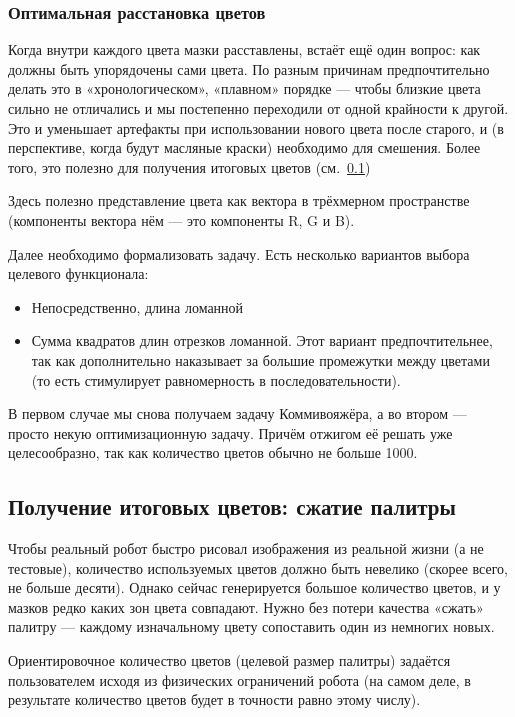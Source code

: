 \subsubsection{Оптимальная расстановка цветов}\label{subsubsec:color-sequence}

Когда внутри каждого цвета мазки расставлены, встаёт ещё один вопрос: как должны быть упорядочены сами цвета.
По разным причинам предпочтительно делать это в «хронологическом», «плавном» порядке — чтобы близкие цвета
сильно не отличались и мы постепенно переходили от одной крайности к другой.
Это и уменьшает артефакты при использовании нового цвета после старого,
и (в перспективе, когда будут масляные краски) необходимо для смешения.
Более того, это полезно для получения итоговых цветов (см.~\ref{subsec:getting-final-colors})

Здесь полезно представление цвета как вектора в трёхмерном пространстве (компоненты вектора нём — это компоненты R, G и B).

Далее необходимо формализовать задачу.
Есть несколько вариантов выбора целевого функционала:
\begin{itemize}
    \item Непосредственно, длина ломанной
    \item Сумма квадратов длин отрезков ломанной.
    Этот вариант предпочтительнее, так как дополнительно наказывает за большие промежутки между цветами
    (то есть стимулирует равномерность в последовательности).
\end{itemize}

В первом случае мы снова получаем задачу Коммивояжёра, а во втором — просто некую оптимизационную задачу.
Причём отжигом её решать уже целесообразно, так как количество цветов обычно не больше 1000.


\subsection{Получение итоговых цветов: сжатие палитры}\label{subsec:getting-final-colors}
Чтобы реальный робот быстро рисовал изображения из реальной жизни (а не тестовые),
количество используемых цветов должно быть невелико (скорее всего, не больше десяти).
Однако сейчас генерируется большое количество цветов, и у мазков редко каких зон цвета совпадают.
Нужно без потери качества «сжать» палитру — каждому изначальному цвету сопоставить один из немногих новых.

Ориентировочное количество цветов (целевой размер палитры) задаётся пользователем исходя из физических ограничений робота
(на самом деле, в результате количество цветов будет в точности равно этому числу).

